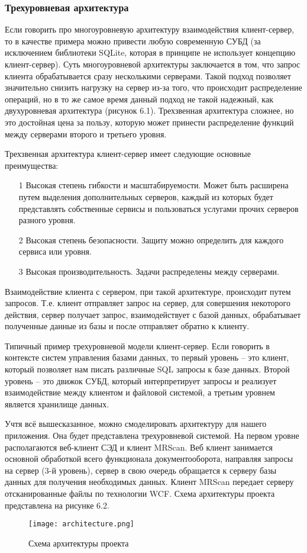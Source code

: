 \subsubsection{Трехуровневая архитектура}

Если говорить про многоуровневую архитектуру взаимодействия  клиент-сервер, то в качестве примера можно привести любую современную СУБД (за исключением библиотеки SQLite, которая в принципе не использует концепцию клиент-сервер). Суть многоуровневой архитектуры заключается в том, что запрос клиента обрабатывается сразу несколькими серверами. Такой подход позволяет значительно снизить нагрузку на сервер из-за того, что происходит распределение операций, но в то же самое время данный подход не такой надежный, как двухуровневая архитектура (рисунок 6.1). Трехзвенная архитектура сложнее, но это достойная цена за пользу, которую может принести распределение функций между серверами второго и третьего уровня.

Трехзвенная архитектура клиент-сервер имеет следующие основные преимущества:
\begin{enumerate}
	\item[1] Высокая степень гибкости и масштабируемости. Может быть расширена путем выделения дополнительных серверов, каждый из которых будет представлять собственные сервисы и пользоваться услугами прочих серверов разного уровня.
	\item[2] Высокая степень безопасности. Защиту можно определить для каждого сервиса или уровня.
	\item[3] Высокая производительность. Задачи распределены между серверами.
\end{enumerate}

Взаимодействие клиента с сервером, при такой архитектуре, происходит путем запросов. Т.е. клиент отправляет запрос на сервер, для совершения некоторого действия, сервер получает запрос, взаимодействует с базой данных, обрабатывает полученные данные из базы и после отправляет обратно к клиенту.

Типичный пример трехуровневой модели клиент-сервер. Если говорить в контексте систем управления базами данных, то первый уровень – это клиент, который позволяет нам писать различные SQL запросы к базе данных. Второй уровень – это движок СУБД, который интерпретирует запросы и реализует взаимодействие между клиентом и файловой системой, а третьим уровнем является хранилище данных.

Учтя всё вышесказанное, можно смоделировать архитектуру для нашего приложения. Она будет представлена трехуровневой системой. На первом уровне располагаются веб-клиент СЭД и клиент MRScan. Веб клиент занимается основной обработкой всего функционала документооборота, направляя запросы на сервер (3-й уровень), сервер в свою очередь обращается к серверу базы данных для получения необходимых данных. Клиент MRScan передает серверу отсканированные файлы по технологии WCF. Схема архитектуры проекта представлена на рисунке 6.2.

\begin{figure}[h!]
	\centering
	\texttt{[image: architecture.png]}
	\caption{Схема архитектуры проекта}
	\clearpage
\end{figure}